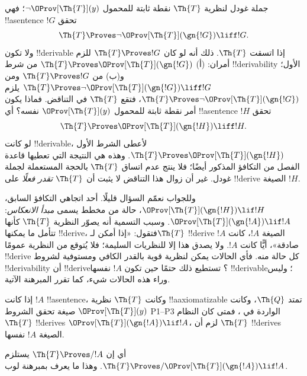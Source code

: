 \documentclass[../../../include/open-logic-section]{subfiles}
\begin{document}


جملة غودل لنظرية $\Th{T}$ نقطة ثابتة للمحمول $\lnot
\OProv[\Th{T}](y)$؛ فهي !!a{sentence} $!G$ تحقق
\[
\Th{T} \Proves \lnot \OProv[\Th{T}](\gn{!G}) \liff !G.
\]
ولا تكون !!{derivable} إذا اتسقت $\Th{T}$.
ذلك أنه لو كان $\Th{T} \Proves !G$ للزم أمران:
(أ) $\Th{T} \Proves \OProv[\Th{T}](\gn{!G})$ من شرط
!!{derivability} الأول؛ و(ب) من $\Th{T} \Proves !G$
ومن $\Th{T} \Proves \lnot \OProv[\Th{T}](\gn{!G})
\liff !G$ يلزم $\Th{T} \Proves \lnot \OProv[\Th{T}](\gn{!G})$،
فتقع $\Th{T}$ في التناقض. فماذا يكون أمر نقطة ثابتة للمحمول
$\OProv[\Th{T}](y)$ نفسه؟ أي !!a{sentence} $!H$ تحقق
\[
\Th{T} \Proves \OProv[\Th{T}](\gn{!H}) \liff !H.
\]
لو كانت !!{derivable}، لأعطى الشرط الأول
$\Th{T} \Proves \OProv[\Th{T}](\gn{!H})$.
وهذه هي النتيجة التي تعطيها قاعدة الفصل من التكافؤ المذكور أيضًا؛
فلا ينتج عدم اتساق $\Th{T}$ بالحجة المستعملة لجملة غودل.
غير أن زوال هذا التناقض لا يثبت أن $\Th{T}$
\emph{تقدر فعلًا} على !!{derive} الصيغة $!H$.

وللجواب نعمّم السؤال قليلًا. أحد اتجاهي التكافؤ السابق،
$\OProv[\Th{T}](\gn{!H}) \lif !H$، حالة من مخطط يسمى
\emph{مبدأ الانعكاس}: $\OProv[\Th{T}](\gn{!A}) \lif !A$.
وسبب التسمية أنه يصوّر النظرية $\Th{T}$ كأنها تتأمل ما يمكنها
!!{derive}، فتقول: «إذا أمكن لـ$\Th{T}$ !!{derive}
الصيغة $!A$، كانت $!A$ صادقة»، أيًّا كانت $!A$.
ولا يصدق هذا إلا للنظريات السليمة؛ فلا يُتوقع من النظرية عمومًا
!!{derive} كل حالة منه. فأي الحالات يمكن لنظرية قوية بالقدر
الكافي ومستوفية لشروط !!{derivability} أن !!{derive}؟
تستطيع ذلك حتمًا حين تكون $!A$ نفسها !!{derivable}؛ وليس وراء
هذه الحالات شيء، كما تقرر المبرهنة الآتية.

\begin{thm}
إذا كانت $!A$ !!a{sentence}، وكانت $\Th{T}$ نظرية
!!a{axiomatizable} تمتد $\Th{Q}$، وكانت
$\OProv[\Th{T}](y)$ صيغة تحقق الشروط P1--P3 الواردة في
، فمتى كان النظام $\Th{T}$ !!{derive}s
$\OProv[\Th{T}](\gn{!A}) \lif !A$، لزم أن $\Th{T}$
!!{derive}s الصيغة $!A$ نفسها.
\end{thm}

أي إن $\Th{T} \Proves/ !A$ يستلزم
$\Th{T} \Proves/ \OProv[\Th{T}](\gn{!A}) \lif !A$.
وهذا ما يعرف بمبرهنة لوب.
\end{document}
